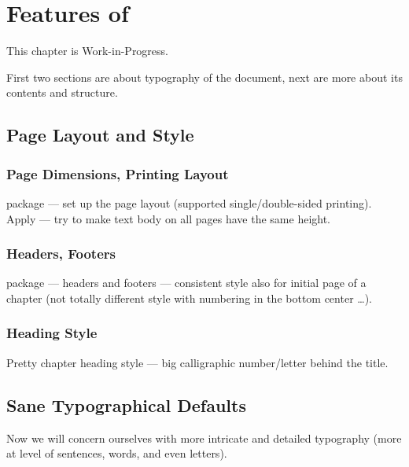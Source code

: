 \chapter{Features of \TeXtured{}} \label{ch:Features}

\begin{Note}
    This chapter is Work-in-Progress.
\end{Note}

First two sections are about typography of the document, next are more about its contents and structure.

\section{Page Layout and Style}%
\label{sec:Page Layout}

\subsection{Page Dimensions, Printing Layout}%
\label{sub:Page Dimensions}

 package --- set up the page layout (supported single/double-sided printing).
Apply \macro{\flushbottom} --- try to make text body on all pages have the same height.

\subsection{Headers, Footers}%
\label{sub:Headers Footers}

 package --- headers and footers --- consistent style also for initial page of a chapter (not totally different style with numbering in the bottom center \ldots).

\subsection{Heading Style}%
\label{sub:Heading Style}

Pretty chapter heading style --- big calligraphic number/letter behind the title.


\section{Sane Typographical Defaults}%
\label{sec:Sane Typographical Defaults}

Now we will concern ourselves with more intricate and detailed typography (more at level of sentences, words, and even letters).

